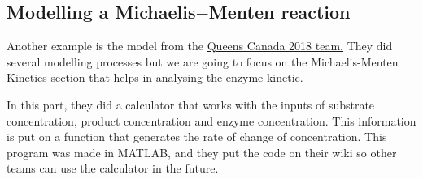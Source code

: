 \documentclass[11pt, letterpaper, english]{article}
\begin{document}
    \subsection{Modelling a Michaelis\texorpdfstring{$-$}{Lg}Menten reaction }
    \par {Another example is the model from the \href{https://2018.igem.org/Team:Queens_Canada/Michaelis-Menten_Kinetics}{Queens Canada 2018 team.} They did several modelling processes but we are going to focus on the Michaelis-Menten Kinetics section that helps in analysing the enzyme kinetic.} 
    \par {In this part, they did a calculator that works with the inputs of substrate concentration, product concentration and enzyme concentration. This information is put on a function that generates the rate of change of concentration. This program was made in MATLAB, and they put the code on their wiki so other teams can use the calculator in the future.}
    
\end{document}
